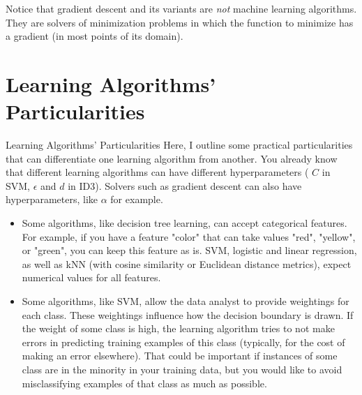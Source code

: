 \documentclass[9pt,dvipsnames]{beamer}
\begin{document}
\begin{frame}
	Notice that gradient descent and its variants are \textit{not} machine learning algorithms. They are solvers of minimization problems in which the function to minimize has a gradient (in most points of its domain).
\end{frame}

\section{Learning Algorithms' Particularities}
\begin{frame}{Learning Algorithms' Particularities}
	Here, I outline some practical particularities that can differentiate one learning algorithm from another. You already know that different learning algorithms can have different hyperparameters ( $C$ in SVM, $\epsilon$ and $d$ in ID3). Solvers such as gradient descent can also have hyperparameters, like $\alpha$ for example.
	
	\begin{itemize}
		\item Some algorithms, like decision tree learning, can accept categorical features. For example, if you have a feature "color" that can take values "red", "yellow", or "green", you can keep this feature as is. SVM, logistic and linear regression, as well as kNN (with cosine similarity or Euclidean distance metrics), expect numerical values for all features.
		\item Some algorithms, like SVM, allow the data analyst to provide weightings for each class. These weightings influence how the decision boundary is drawn. If the weight of some class is high, the learning algorithm tries to not make errors in predicting training examples of this class (typically, for the cost of making an error elsewhere). That could be important if instances of some class are in the minority in your training data, but you would like to avoid misclassifying examples of that class as much as possible.
	\end{itemize}
\end{frame}
\end{document}
